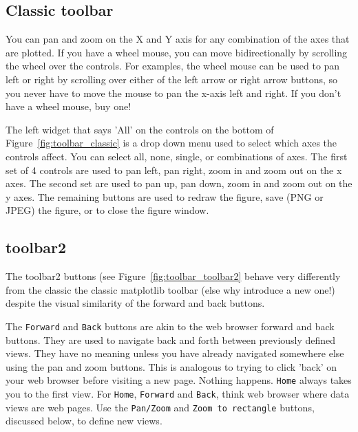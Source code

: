 \documentclass[twoside]{book}
\begin{document}
\subsection{Classic toolbar}
\label{sec:toolbar_classic}

You can pan and zoom on the X and Y axis for any combination of the
axes that are plotted.  If you have a wheel mouse, you can move
bidirectionally by scrolling the wheel over the controls.  For
examples, the wheel mouse can be used to pan left or right by
scrolling over either of the left arrow or right arrow buttons, so you
never have to move the mouse to pan the x-axis left and right.  If you
don't have a wheel mouse, buy one!

The left widget that says 'All' on the controls on the bottom of
Figure~\ref{fig:toolbar_classic} is a drop down menu used to select
which axes the controls affect.  You can select all, none, single, or
combinations of axes.  The first set of 4 controls are used to pan
left, pan right, zoom in and zoom out on the x axes.  The second set
are used to pan up, pan down, zoom in and zoom out on the y axes.  The
remaining buttons are used to redraw the figure, save (PNG or JPEG)
the figure, or to close the figure window.


\subsection{toolbar2}
\label{sec:toolbar_toolbar2}

The toolbar2 buttons (see Figure~\ref{fig:toolbar_toolbar2} behave
very differently from the classic the classic matplotlib toolbar (else
why introduce a new one!) despite the visual similarity of the forward
and back buttons.

The \texttt{Forward} and \texttt{Back} buttons are akin to the web browser
forward and back buttons.  They are used to navigate back and forth
between previously defined views.  They have no meaning unless you
have already navigated somewhere else using the pan and zoom buttons.
This is analogous to trying to click 'back' on your web browser before
visiting a new page.  Nothing happens.  \texttt{Home} always takes you to
the first view.  For \texttt{Home}, \texttt{Forward} and \texttt{Back}, think web
browser where data views are web pages.  Use the \texttt{Pan/Zoom} and
\texttt{Zoom to rectangle} buttons, discussed below, to define new views.
\end{document}
